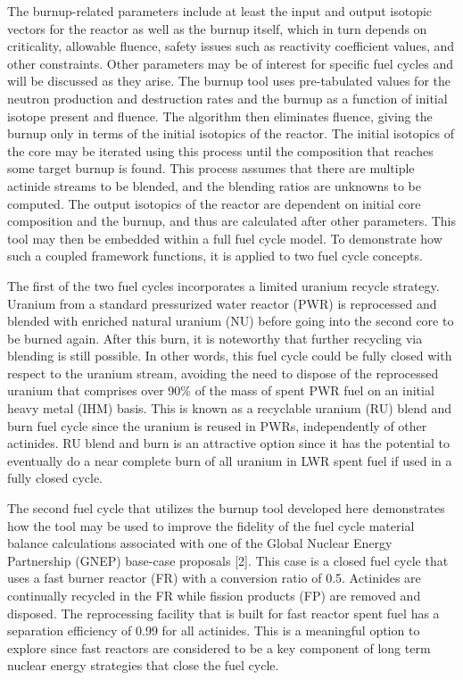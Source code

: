The burnup-related parameters include at least the input and output isotopic vectors for the reactor 
as well as the burnup itself, which in turn depends on criticality, allowable fluence, safety issues 
such as reactivity coefficient values, and other constraints.  Other parameters may be of interest 
for specific fuel cycles and will be discussed as they arise.  The burnup tool uses pre-tabulated 
values for the neutron production and destruction rates and the burnup as a function of initial 
isotope present and fluence.  The algorithm then eliminates fluence, giving the burnup only in 
terms of the initial isotopics of the reactor.  The initial isotopics of the core may be iterated 
using this process until the composition that reaches some target burnup is found.  This process 
assumes that there are multiple actinide streams to be blended, and the blending ratios are unknowns 
to be computed.  The output isotopics of the reactor are dependent on initial core composition and 
the burnup, and thus are calculated after other parameters.   This tool may then be embedded within 
a full fuel cycle model.  To demonstrate how such a coupled framework functions, it is applied to 
two fuel cycle concepts.  

The first of the two fuel cycles incorporates a limited uranium recycle strategy.   Uranium from a 
standard pressurized water reactor (PWR) is reprocessed and blended with enriched natural uranium 
(NU) before going into the second core to be burned again.  After this burn, it is noteworthy that 
further recycling via blending is still possible.  In other words, this fuel cycle could be fully 
closed with respect to the uranium stream, avoiding the need to dispose of the reprocessed uranium 
that comprises over 90\% of the mass of spent PWR fuel on an initial heavy metal (IHM) basis.  
This is known as a recyclable uranium (RU) blend and burn fuel cycle since the uranium is reused 
in PWRs, independently of other actinides.  RU blend and burn is an attractive option since it has 
the potential to eventually do a near complete burn of all uranium in LWR spent fuel if used in a 
fully closed cycle.

The second fuel cycle that utilizes the burnup tool developed here demonstrates how the tool may 
be used to improve the fidelity of the fuel cycle material balance calculations associated with 
one of the Global Nuclear Energy Partnership (GNEP) base-case proposals [2].  This case is a 
closed fuel cycle that uses a fast burner reactor (FR) with a conversion ratio of 0.5.  
Actinides are continually recycled in the FR while fission products (FP) are removed and 
disposed.  The reprocessing facility that is built for fast reactor spent fuel has a separation 
efficiency of 0.99 for all actinides.  This is a meaningful option to explore since fast reactors 
are considered to be a key component of long term nuclear energy strategies that close the fuel cycle.

